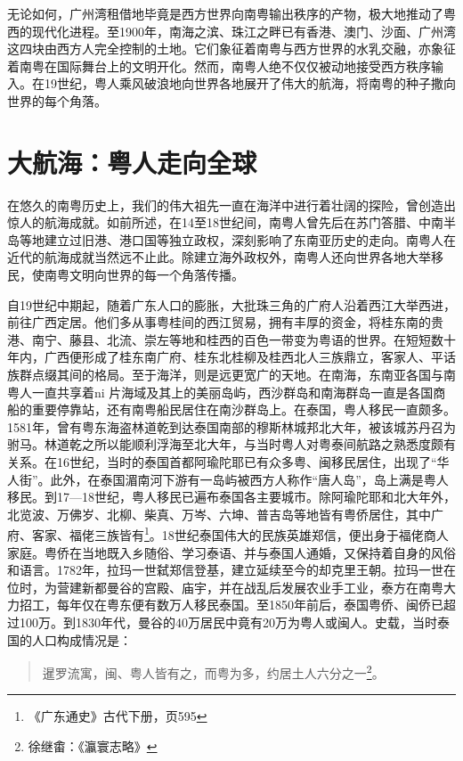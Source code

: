 无论如何，广州湾租借地毕竟是西方世界向南粤输出秩序的产物，极大地推动了粤西的现代化进程。至1900年，南海之滨、珠江之畔已有香港、澳门、沙面、广州湾这四块由西方人完全控制的土地。它们象征着南粤与西方世界的水乳交融，亦象征着南粤在国际舞台上的文明开化。然而，南粤人绝不仅仅被动地接受西方秩序输入。在19世纪，粤人乘风破浪地向世界各地展开了伟大的航海，将南粤的种子撒向世界的每个角落。


\section{大航海：粤人走向全球}

在悠久的南粤历史上，我们的伟大祖先一直在海洋中进行着壮阔的探险，曾创造出惊人的航海成就。如前所述，在14至18世纪间，南粤人曾先后在苏门答腊、中南半岛等地建立过旧港、港口国等独立政权，深刻影响了东南亚历史的走向。南粤人在近代的航海成就当然远不止此。除建立海外政权外，南粤人还向世界各地大举移民，使南粤文明向世界的每一个角落传播。

自19世纪中期起，随着广东人口的膨胀，大批珠三角的广府人沿着西江大举西进，前往广西定居。他们多从事粤桂间的西江贸易，拥有丰厚的资金，将桂东南的贵港、南宁、藤县、北流、崇左等地和桂西的百色一带变为粤语的世界。在短短数十年内，广西便形成了桂东南广府、桂东北桂柳及桂西北人三族鼎立，客家人、平话族群点缀其间的格局。至于海洋，则是远更宽广的天地。在南海，东南亚各国与南粤人一直共享着ni 片海域及其上的美丽岛屿，西沙群岛和南海群岛一直是各国商船的重要停靠站，还有南粤船民居住在南沙群岛上。在泰国，粤人移民一直颇多。1581年，曾有粤东海盗林道乾到达泰国南部的穆斯林城邦北大年，被该城苏丹召为驸马。林道乾之所以能顺利浮海至北大年，与当时粤人对粤泰间航路之熟悉度颇有关系。在16世纪，当时的泰国首都阿瑜陀耶已有众多粤、闽移民居住，出现了“华人街”。此外，在泰国湄南河下游有一岛屿被西方人称作“唐人岛”，岛上满是粤人移民。到17—18世纪，粤人移民已遍布泰国各主要城市。除阿瑜陀耶和北大年外，北览波、万佛岁、北柳、柴真、万岑、六坤、普吉岛等地皆有粤侨居住，其中广府、客家、福佬三族皆有\footnote{《广东通史》古代下册，页595}。18世纪泰国伟大的民族英雄郑信，便出身于福佬商人家庭。粤侨在当地既入乡随俗、学习泰语、并与泰国人通婚，又保持着自身的风俗和语言。1782年，拉玛一世弑郑信登基，建立延续至今的却克里王朝。拉玛一世在位时，为营建新都曼谷的宫殿、庙宇，并在战乱后发展农业手工业，泰方在南粤大力招工，每年仅在粤东便有数万人移民泰国。至1850年前后，泰国粤侨、闽侨已超过100万。到1830年代，曼谷的40万居民中竟有20万为粤人或闽人。史载，当时泰国的人口构成情况是：

\begin{quote}

暹罗流寓，闽、粤人皆有之，而粤为多，约居土人六分之一\footnote{徐继畬：《瀛寰志略》}。

\end{quote}

